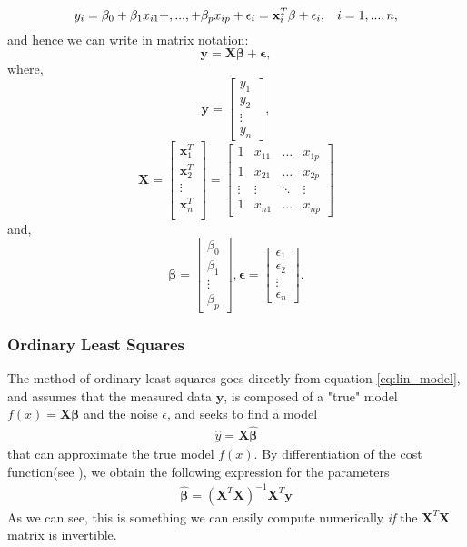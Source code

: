 \documentclass[../main.tex]{subfiles}
\begin{document}
\begin{equation}
    y_i = \beta_0 + \beta_{1}x_{i1}+,...,+\beta_{p}x_{ip} + \epsilon_i = \mathbf{x}_i^{T} \mathbf{\beta} + \epsilon_i, \hspace{3mm} i = 1,...,n, 
\end{equation}
and hence we can write in matrix notation:
\begin{equation}
    \mathbf{y} =\mathbf{X}\mathbf{\beta} + \mathbf{\epsilon}, \label{eq:lin_model}
\end{equation}
where,
\[
\mathbf{y} = \begin{bmatrix} 
    y_1\\
    y_2\\
    \vdots\\
    y_n
    \end{bmatrix},
\]
\[
\mathbf{X} = \begin{bmatrix}

    \mathbf{x}_1^{T}\\
    \mathbf{x}_2^{T}\\
    \vdots\\
    \mathbf{x}_n^{T}\\
    \end{bmatrix}  
=
\begin{bmatrix}
1   & x_{11} & \hdots &x_{1p}\\
1   &   x_{21}& \hdots& x_{2p}\\
\vdots& \vdots& \ddots& \vdots\\
1   &x_{n1} & \hdots&   x_{np}
\end{bmatrix}
\]
and,
\[
\mathbf{\beta} = \begin{bmatrix}
\beta_0    \\
\beta_1    \\
\vdots    \\
\beta_p    
\end{bmatrix},
\mathbf{\epsilon} = \begin{bmatrix}
\epsilon_1\\
\epsilon_2\\
\vdots\\
\epsilon_n
\end{bmatrix}.
\]
\subsubsection{Ordinary Least Squares}\label{refmethod:OLS}
The method of ordinary least squares goes directly from equation \eqref{eq:lin_model}, and assumes that the measured data $\mathbf{y}$, is composed of a "true" model $f(x) = \mathbf{X\beta}$ and the noise $\epsilon$, and seeks to find a model
\begin{align*}
    \hat y = \mathbf{X}\mathbf{\hat\beta}
\end{align*}
that can approximate the true model $f(x)$. By differentiation of the cost function(see \cite{Lecture_notes_Morten}), we obtain the following expression for the parameters 
\begin{align}
    \mathbf{\hat\beta} = (\mathbf{X}^{T}\mathbf{X})^{-1}\mathbf{X}^T\mathbf{y}
\end{align}
As we can see, this is something we can easily compute numerically \emph{if} the $\mathbf{X}^{T}\mathbf{X}$ matrix is invertible. 
\end{document}
